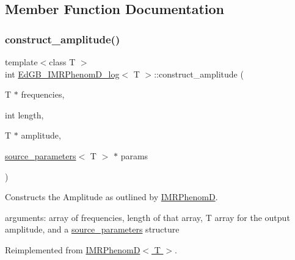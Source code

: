 \subsection{Member Function Documentation}
\mbox{\label{classEdGB__IMRPhenomD__log_ac6acdf1b0231e33b861202bcd9c51ee7}} 
\subsubsection{\texorpdfstring{construct\+\_\+amplitude()}{construct\_amplitude()}}
{\footnotesize\ttfamily template$<$class T $>$ \\
int \hyperlink{classEdGB__IMRPhenomD__log}{Ed\+G\+B\+\_\+\+I\+M\+R\+Phenom\+D\+\_\+log}$<$ T $>$\+::construct\+\_\+amplitude (\begin{DoxyParamCaption}\item[{T $\ast$}]{frequencies,  }\item[{int}]{length,  }\item[{T $\ast$}]{amplitude,  }\item[{\hyperlink{structsource__parameters}{source\+\_\+parameters}$<$ T $>$ $\ast$}]{params }\end{DoxyParamCaption})\hspace{0.3cm}{\ttfamily [virtual]}}



Constructs the Amplitude as outlined by \hyperlink{classIMRPhenomD}{I\+M\+R\+PhenomD}. 

arguments\+: array of frequencies, length of that array, T array for the output amplitude, and a \hyperlink{structsource__parameters}{source\+\_\+parameters} structure 

Reimplemented from \hyperlink{classIMRPhenomD_a95e7946061fa24fdb7a770dba02147be}{I\+M\+R\+Phenom\+D$<$ T $>$}.

\mbox{\label{classEdGB__IMRPhenomD__log_a62aa82aaadc4210d09e95f8807f8f3c4}} 
